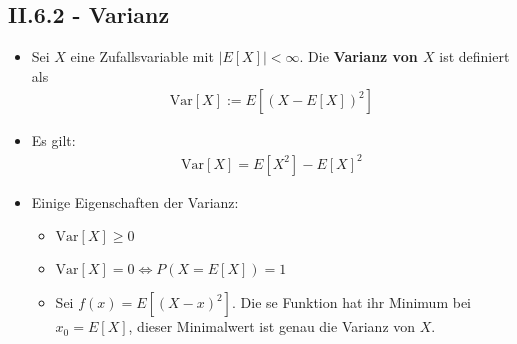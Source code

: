 \documentclass{scrartcl}
\newcommand{\var}{\text{Var}}
\begin{document}
\subsection*{II.6.2 - Varianz}
\begin{itemize}
    \item Sei $X$ eine Zufallsvariable mit $|E[X]| < \infty$. Die \textbf{Varianz von $X$} ist definiert als
    \begin{align*}
        \text{Var}[X] := E[(X- E[X])^2]
    \end{align*}
    \item Es gilt:
    \begin{align*}
        \text{Var}[X] = E[X^2]-E[X]^2
    \end{align*}
    \item Einige Eigenschaften der Varianz:
    \begin{itemize}
        \item $\var[X] \geq 0$
        \item $\var[X] = 0 \Longleftrightarrow P(X = E[X]) = 1$
        \item Sei $f(x) = E[(X-x)^2]$. Die se Funktion hat ihr Minimum bei $x_0 = E[X]$, dieser Minimalwert ist genau die Varianz von $X$.
    \end{itemize}
\end{itemize}
\end{document}
